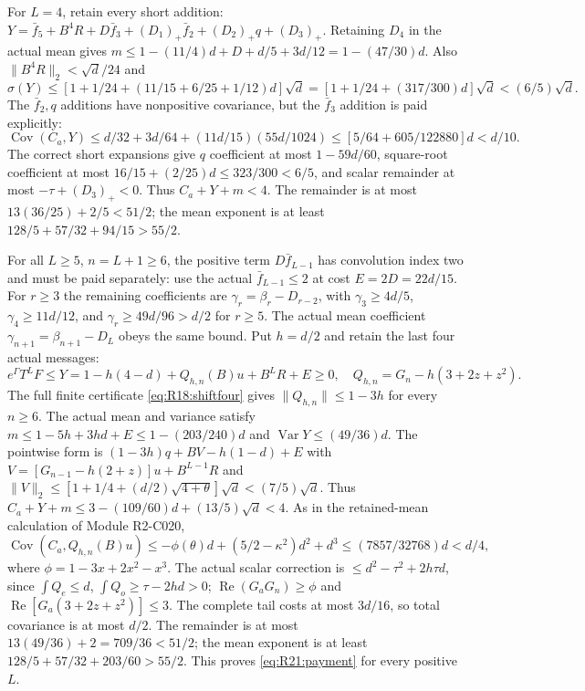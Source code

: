 For $L=4$, retain every short addition:
$Y=\bar f_5+B^4R+D\bar f_3+(D_1)_+\bar f_2
+(D_2)_+q+(D_3)_+$.
Retaining $D_4$ in the actual mean gives
$m\le1-(11/4)d+D+d/5+3d/12=1-(47/30)d$.
Also $\|B^4R\|_2<\sqrt d/24$ and
\[
\sigma(Y)\le[1+1/24+(11/15+6/25+1/12)d]\sqrt d
=[1+1/24+(317/300)d]\sqrt d<(6/5)\sqrt d.
\]
The $\bar f_2,q$ additions have nonpositive covariance, but the
$\bar f_3$ addition is paid explicitly:
\[
\operatorname{Cov}(C_a,Y)\le d/32+3d/64
+(11d/15)(55d/1024)
\le[5/64+605/122880]d<d/10.
\]
The correct short expansions give $q$ coefficient at most
$1-59d/60$, square-root coefficient at most
$16/15+(2/25)d\le323/300<6/5$, and scalar remainder at most
$-\tau+(D_3)_+<0$. Thus $C_a+Y+m<4$.
The remainder is at most $13(36/25)+2/5<51/2$;
the mean exponent is at least $128/5+57/32+94/15>55/2$.

For all $L\ge5$, $n=L+1\ge6$, the positive term
$D\bar f_{L-1}$ has convolution index two and must be paid separately:
use the actual $\bar f_{L-1}\le2$ at cost $E=2D=22d/15$.
For $r\ge3$ the remaining coefficients are
$\gamma_r=\beta_r-D_{r-2}$, with
$\gamma_3\ge4d/5$, $\gamma_4\ge11d/12$,
and $\gamma_r\ge49d/96>d/2$ for $r\ge5$.
The actual mean coefficient $\gamma_{n+1}=\beta_{n+1}-D_L$ obeys
the same bound. Put $h=d/2$ and retain the last four actual messages:
\begin{equation}\tag{R21.9.1}\label{eq:R21:long}
e^\Gamma T^LF\le Y=1-h(4-d)+Q_{h,n}(B)u+B^LR+E\ge0,
\quad Q_{h,n}=G_n-h(3+2z+z^2).
\end{equation}
The full finite certificate \eqref{eq:R18:shiftfour} gives
$\|Q_{h,n}\|\le1-3h$ for every $n\ge6$.
The actual mean and variance satisfy
$m\le1-5h+3hd+E\le1-(203/240)d$ and
$\operatorname{Var}Y\le(49/36)d$.
The pointwise form is $(1-3h)q+BV-h(1-d)+E$ with
$V=[G_{n-1}-h(2+z)]u+B^{L-1}R$ and
$\|V\|_2\le[1+1/4+(d/2)\sqrt{4+\theta}]\sqrt d<(7/5)\sqrt d$.
Thus $C_a+Y+m\le3-(109/60)d+(13/5)\sqrt d<4$.
As in the retained-mean calculation of Module R2-C020,
\[
\operatorname{Cov}(C_a,Q_{h,n}(B)u)
\le-\phi(\theta)d+(5/2-\kappa^2)d^2+d^3
\le(7857/32768)d<d/4,
\]
where $\phi=1-3x+2x^2-x^3$.
The actual scalar correction is
$\le d^2-\tau^2+2h\tau d$, since
$\int Q_e\le d$, $\int Q_o\ge\tau-2hd>0$;
$\operatorname{Re}(G_aG_n)\ge\phi$ and
$\operatorname{Re}[G_a(3+2z+z^2)]\le3$.
The complete tail costs at most $3d/16$, so total covariance is
at most $d/2$. The remainder is at most
$13(49/36)+2=709/36<51/2$; the mean exponent is at least
$128/5+57/32+203/60>55/2$.
This proves \eqref{eq:R21:payment} for every positive $L$.

